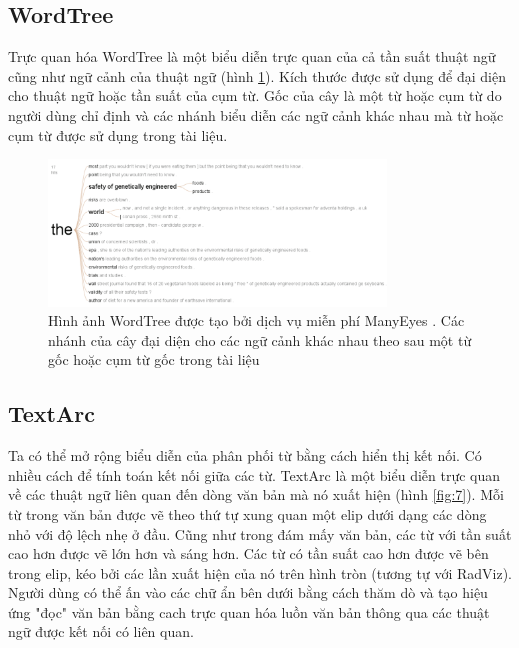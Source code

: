 \documentclass[14pt, a4paper]{article}
\numberwithin{equation}{section}
\numberwithin{figure}{section}
\numberwithin{dl}{section}
\numberwithin{md}{section}
\numberwithin{bd}{section}
\numberwithin{dn}{section}
\numberwithin{hq}{section}
\begin{document}
    \subsection{WordTree}

    Trực quan hóa WordTree \cite{450} là một biểu diễn trực quan của cả tần suất thuật ngữ cũng như ngữ cảnh của thuật ngữ (hình \ref{fig:6}).
    Kích thước được sử dụng để đại diện cho thuật ngữ hoặc tần suất của cụm từ.
    Gốc của cây là một từ hoặc cụm từ do người dùng chỉ định và các nhánh biểu diễn các ngữ cảnh khác nhau mà từ hoặc cụm từ được sử dụng trong tài liệu.


    \begin{figure}[h!]
        \centering
        \includegraphics[width=0.8\textwidth]{6.png}
        \caption{Hình ảnh WordTree được tạo bởi dịch vụ miễn phí ManyEyes \cite{196}.
        Các nhánh của cây đại diện cho các ngữ cảnh khác nhau theo sau một từ gốc hoặc cụm từ gốc trong tài liệu}
        \label{fig:6}
    \end{figure}


    \subsection{TextArc}

    Ta có thể mở rộng biểu diễn của phân phối từ bằng cách hiển thị kết nối.
    Có nhiều cách để tính toán kết nối giữa các từ.
    TextArc \cite{312} là một biểu diễn trực quan về các thuật ngữ liên quan đến dòng văn bản mà nó xuất hiện (hình \ref{fig:7}).
    Mỗi từ trong văn bản được vẽ theo thứ tự xung quan một elip dưới dạng các dòng nhỏ với độ lệch nhẹ ở đầu.
    Cũng như trong đám mấy văn bản, các từ với tần suất cao hơn được vẽ lớn hơn và sáng hơn.
    Các từ có tần suất cao hơn được vẽ bên trong elip, kéo bởi các lần xuất hiện của nó trên hình tròn (tương tự với RadViz).
    Người dùng có thể ấn vào các chữ ẩn bên dưới bằng cách thăm dò và tạo hiệu ứng "đọc" văn bản bằng cach trực quan hóa luồn văn bản thông qua các thuật ngữ được kết nối có liên quan.
\end{document}
